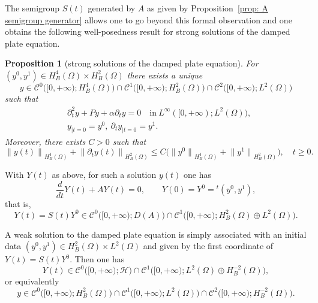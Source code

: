\documentclass[10pt]{amsart}
\theoremstyle{plain}
\newtheorem{proposition}[theorem]{Proposition}
\theoremstyle{definition}
\renewcommand{\H}{{\mathcal H}}
\newcommand{\transp}{\ensuremath{\phantom{}^{t}}}
\newcommand{\Norm}[2]{{\| #1 \|}_{#2}}
\newcommand{\Con}{\ensuremath{\mathscr C}}
\begin{document}
The semigroup $S(t)$ generated by $A$ as given by
Proposition~\ref{prop: A semigroup generator} allows one to go beyond
this formal observation and one obtains the
following well-posedness result for strong solutions of the damped
plate equation.

\skpt
\begin{proposition}[strong solutions of the damped plate equation]
\label{prop: strong solutions plate equation}
For $(y^0, y^1) \in H^4_B(\Omega)\times H^2_B(\Omega)$ there exists a unique
\begin{equation*}
y \in \Con^0 \big([0,+\infty); H^4_B(\Omega)\big)
\cap \Con^1 \big([0,+\infty); H^2_B(\Omega) \big) \cap
\Con^2\big([0,+\infty); L^2(\Omega)\big)
\end{equation*}
such that
\begin{equation}
\label{eq: damped plate equation-strong solution}
\begin{split}
&\partial_t^2 y + P y + \alpha \partial_t y =0 \quad \text{in} \
L^\infty([0,+\infty); L^2(\Omega)), \\
&y_{|t=0} = y^0, \ \partial_t y_{|t=0} = y^1.
\end{split}
\end{equation}
Moreover, there exists $C>0$ such that
\begin{equation}
\label{eq: continuity strong solution damped plate equation-LS}
\Norm{y (t)}{H^4_B(\Omega)} + \Norm{\partial_t y (t)}{H^2_B(\Omega)}
\leq C \big(\Norm{y^0}{H^4_B(\Omega)} +
\Norm{y^1}{H^2_B(\Omega)}\big), \quad t\geq 0.
\end{equation}
\end{proposition}
With $Y(t)$ as above, for such a solution $y(t)$ one has
\begin{equation*}
\frac{d}{d t} Y(t) + A Y(t) =0, \qquad Y(0) = Y^0 = \transp(y^0,y^1),
\end{equation*}
that is,
\begin{equation*}
Y(t) = S(t) Y^0\in
\Con^0 \big([0,+\infty); D(A) \big)
\cap \Con^1 \big([0,+\infty); H^2_B(\Omega) \oplus L^2(\Omega) \big).
\end{equation*}

A weak solution to the damped plate equation is simply associated with
an initial data $(y^0, y^1) \in H^2_B(\Omega) \times L^2(\Omega)$ and
given by the first coordinate of $Y(t) = S(t) Y^0$. Then one has
\begin{equation*}
Y(t) \in
\Con^0 \big([0,+\infty); \H \big)
\cap \Con^1 \big([0,+\infty); L^2(\Omega) \oplus H^{-2}_B(\Omega) \big),
\end{equation*}
or equivalently
\begin{equation*}
y \in \Con^0 \big([0,+\infty); H^2_B(\Omega)\big)
\cap \Con^1 \big([0,+\infty); L^2(\Omega) \big)
\cap\Con^2\big([0,+\infty); H^{-2}_B(\Omega)\big) .
\end{equation*}
\end{document}
